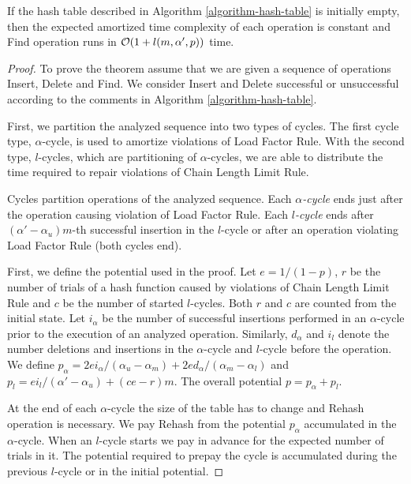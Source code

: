 \begin{theorem}
\label{theorem-amortised-expected-time}
If the hash table described in Algorithm \ref{algorithm-hash-table} is initially empty, then the expected amortized time complexity of each operation is constant and Find operation runs in $\mathcal{O}(1 + l(m, \alpha', p))$ time.
\end{theorem}
\begin{proof}
To prove the theorem assume that we are given a sequence of operations Insert, Delete and Find. 
We consider Insert and Delete successful or unsuccessful according to the comments in Algorithm \ref{algorithm-hash-table}.

First, we partition the analyzed sequence into two types of cycles. 
The first cycle type, $\alpha$-cycle, is used to amortize violations of Load Factor Rule. 
With the second type, $l$-cycles, which are partitioning of $\alpha$-cycles, we are able to distribute the time required to repair violations of Chain Length Limit Rule.

\begin{definition}
Cycles partition operations of the analyzed sequence.
Each \emph{$\alpha$-cycle} ends just after the operation causing violation of Load Factor Rule.
Each \emph{$l$-cycle} ends after $(\alpha'-\alpha_u)m$-th successful insertion in the $l$-cycle or after an operation violating Load Factor Rule (both cycles end).
\end{definition}

First, we define the potential used in the proof.
Let $e = 1/(1 - p)$, $r$ be the number of trials of a hash function caused by violations of Chain Length Limit Rule and $c$ be the number of started $l$-cycles.
Both $r$ and $c$ are counted from the initial state.
Let $i_\alpha$ be the number of successful insertions performed in an $\alpha$-cycle prior to the execution of an analyzed operation.
Similarly, $d_\alpha$ and $i_l$ denote the number deletions and insertions in the $\alpha$-cycle and $l$-cycle before the operation.
We define $p_\alpha = {2ei_{\alpha}}/{(\alpha_u - \alpha_m)} + {2ed_{\alpha}}/{(\alpha_m - \alpha_l)}$ and $p_l = {ei_{l}}/{(\alpha' - \alpha_u)} + (ce - r) m$.
The overall potential $p = p_\alpha + p_l$.

At the end of each $\alpha$-cycle the size of the table has to change and Rehash operation is necessary.
We pay Rehash from the potential $p_\alpha$ accumulated in the $\alpha$-cycle.
When an $l$-cycle starts we pay in advance for the expected number of trials in it.
The potential required to prepay the cycle is accumulated during the previous $l$-cycle or in the initial potential.


\end{proof}
